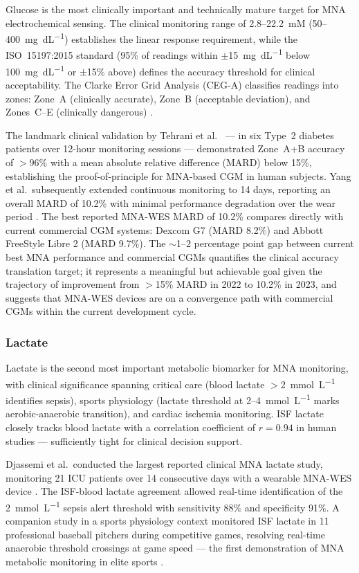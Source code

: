 \documentclass[review,1p]{elsarticle}
\begin{document}
Glucose is the most clinically important and technically mature target for MNA electrochemical sensing. The clinical monitoring range of 2.8--22.2~mM (50--400~mg~dL\textsuperscript{$-1$}) establishes the linear response requirement, while the ISO~15197:2015 standard (95\% of readings within $\pm$15~mg~dL\textsuperscript{$-1$} below 100~mg~dL\textsuperscript{$-1$} or $\pm$15\% above) defines the accuracy threshold for clinical acceptability. The Clarke Error Grid Analysis (CEG-A) classifies readings into zones: Zone~A (clinically accurate), Zone~B (acceptable deviation), and Zones~C--E (clinically dangerous) \cite{Keum2022Clarke}.

The landmark clinical validation by Tehrani et al.\ \cite{Tehrani2022NatBiomedEng} — in six Type~2 diabetes patients over 12-hour monitoring sessions — demonstrated Zone~A+B accuracy of $>$96\% with a mean absolute relative difference (MARD) below 15\%, establishing the proof-of-principle for MNA-based CGM in human subjects. Yang et al.\ subsequently extended continuous monitoring to 14 days, reporting an overall MARD of 10.2\% with minimal performance degradation over the wear period \cite{Yang2023CGM14day}. The best reported MNA-WES MARD of 10.2\% compares directly with current commercial CGM systems: Dexcom G7 (MARD 8.2\%) and Abbott FreeStyle Libre 2 (MARD 9.7\%). The $\sim$1--2 percentage point gap between current best MNA performance and commercial CGMs quantifies the clinical accuracy translation target; it represents a meaningful but achievable goal given the trajectory of improvement from $>$15\% MARD in 2022 to 10.2\% in 2023, and suggests that MNA-WES devices are on a convergence path with commercial CGMs within the current development cycle.

\subsubsection{Lactate}

Lactate is the second most important metabolic biomarker for MNA monitoring, with clinical significance spanning critical care (blood lactate $>$2~mmol~L\textsuperscript{$-1$} identifies sepsis), sports physiology (lactate threshold at 2--4~mmol~L\textsuperscript{$-1$} marks aerobic-anaerobic transition), and cardiac ischemia monitoring. ISF lactate closely tracks blood lactate with a correlation coefficient of $r = 0.94$ in human studies \cite{Djassemi2026ACSsens} — sufficiently tight for clinical decision support.

Djassemi et al.\ conducted the largest reported clinical MNA lactate study, monitoring 21 ICU patients over 14 consecutive days with a wearable MNA-WES device \cite{Djassemi2026ACSsens}. The ISF-blood lactate agreement allowed real-time identification of the 2~mmol~L\textsuperscript{$-1$} sepsis alert threshold with sensitivity 88\% and specificity 91\%. A companion study in a sports physiology context monitored ISF lactate in 11 professional baseball pitchers during competitive games, resolving real-time anaerobic threshold crossings at game speed — the first demonstration of MNA metabolic monitoring in elite sports \cite{Djassemi2026BBE}.
\end{document}
